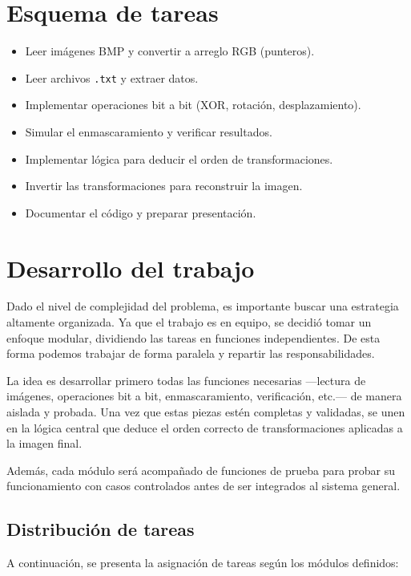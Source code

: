 \documentclass[11pt]{article}
\begin{document}
\section{Esquema de tareas}

\begin{itemize}[label=]
  \item Leer imágenes BMP y convertir a arreglo RGB (punteros). 
  \item Leer archivos \texttt{.txt} y extraer datos.
  \item Implementar operaciones bit a bit (XOR, rotación, desplazamiento).
  \item Simular el enmascaramiento y verificar resultados.
  \item Implementar lógica para deducir el orden de transformaciones.
  \item Invertir las transformaciones para reconstruir la imagen.
  \item Documentar el código y preparar presentación.
\end{itemize}


\section{Desarrollo del trabajo}

Dado el nivel de complejidad del problema, es importante buscar una estrategia altamente organizada. Ya que el trabajo es en equipo, se decidió tomar un enfoque modular, dividiendo las tareas en funciones independientes. De esta forma podemos trabajar de forma paralela y repartir las responsabilidades.

La idea es desarrollar primero todas las funciones necesarias —lectura de imágenes, operaciones bit a bit, enmascaramiento, verificación, etc.— de manera aislada y probada. Una vez que estas piezas estén completas y validadas, se unen en la lógica central que deduce el orden correcto de transformaciones aplicadas a la imagen final.

Además, cada módulo será acompañado de funciones de prueba para probar su funcionamiento con casos controlados antes de ser integrados al sistema general.



\subsection*{Distribución de tareas}

A continuación, se presenta la asignación de tareas según los módulos definidos:
\end{document}
